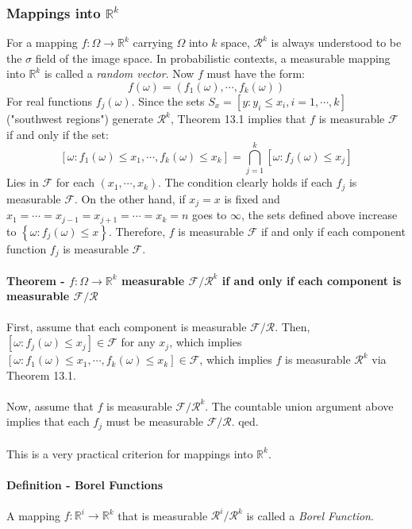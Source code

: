 \documentclass[12pt,a4paper]{article}
\newcommand{\1}[1]{\mathbbm{1}\left\{ #1 \right\}}
\newcommand{\R}{\mathbb{R}}
\newcommand{\fcal}{\mathcal{F}}
\newcommand{\rcal}{\mathcal{R}}
\begin{document}
\subsubsection{Mappings into $\R^k$} For a mapping $f: \Omega \to \R^k$ carrying $\Omega$ into $k$ space, $\rcal^k$ is always understood to be the $\sigma$ field of the image space. In probabilistic contexts, a measurable mapping into $\R^k$ is called a \textit{random vector}. Now $f$ must have the form:
$$
	f(\omega) = (f_1(\omega), \cdots, f_k(\omega))
$$
For real functions $f_j(\omega)$. Since the sets $S_x = \left[y : y_i \leq x_i, i = 1, \cdots, k\right]$ ("southwest regions") generate $\rcal^k$, Theorem 13.1 implies that $f$ is measurable $\fcal$ if and only if the set:
$$
	\left[\omega: f_1(\omega) \leq x_1, \cdots, f_k(\omega) \leq x_k\right] =
	\bigcap_{j=1}^k \left[\omega: f_j(\omega) \leq x_j\right]
$$
Lies in $\fcal$ for each $(x_1, \cdots, x_k)$. The condition clearly holds if each $f_j$ is measurable $\fcal$. On the other hand, if $x_j = x$ is fixed and $x_1 = \cdots = x_{j-1} = x_{j+1} = \cdots = x_k = n$ goes to $\infty$, the sets defined above increase to $\left\{\omega: f_j(\omega) \leq x\right\}$. Therefore, $f$ is measurable $\fcal$ if and only if each component function $f_j$ is measurable $\fcal$.

\paragraph{Theorem - $f:\Omega \to \R^k$ measurable $\fcal/\rcal^k$ if and only if each component is measurable $\fcal/\rcal$} First, assume that each component is measurable $\fcal/\rcal$. Then, $\left[\omega: f_j(\omega) \leq x_j\right] \in \fcal$ for any $x_j$, which implies $\left[\omega: f_1(\omega) \leq x_1, \cdots, f_k(\omega) \leq x_k\right] \in \fcal$, which implies $f$ is measurable $\rcal^k$ via Theorem 13.1.
\\\\
Now, assume that $f$ is measurable $\fcal/\rcal^k$. The countable union argument above implies that each $f_j$ must be measurable $\fcal/\rcal$. qed.
\\\\
This is a very practical criterion for mappings into $\R^k$.

\paragraph{Definition - Borel Functions} A mapping $f: \R^i \to \R^k$ that is measurable $\rcal^i/\rcal^k$ is called a \textit{Borel Function}.
\end{document}
